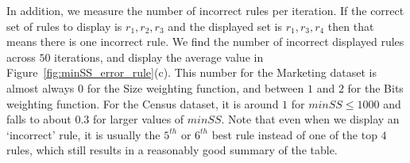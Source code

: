 In addition, we measure the number of incorrect rules per iteration. If the correct set of rules to display is $r_1, r_2, r_3$ and the displayed set is $r_1, r_3, r_4$ then that means there is one incorrect rule. We find the number of incorrect displayed rules across $50$ iterations, and display the average value in Figure~\ref{fig:minSS_error_rule}(c). This number for the Marketing dataset is almost always $0$ for the Size weighting function, and between $1$ and $2$ for the Bits weighting function. For the Census dataset, it is around $1$ for $minSS \leq 1000$ and falls to about $0.3$ for larger values of $minSS$. Note that even when we display an `incorrect' rule, it is usually the $5^{th}$ or $6^{th}$ best rule instead of one of the top $4$ rules, which still results in a reasonably good summary of the table.

